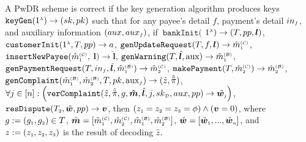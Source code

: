 \begin{definition}[Correctness] A PwDR scheme is correct if the key generation algorithm produces keys $\mathtt{keyGen}(1^{\scriptscriptstyle \lambda})\rightarrow (sk,pk)$ such that for any payee's detail $f$, payment's detail $in_{\scriptscriptstyle f}$, and auxiliary information $(aux, aux_{\scriptscriptstyle f})$, if $\ \mathtt{bankInit}($ $1^{\scriptscriptstyle \lambda})\rightarrow (T, pp, \bm{l})$, $\mathtt{customerInit} (1^{\scriptscriptstyle \lambda}, T, pp)\rightarrow a$, $\mathtt{genUpdateRequest}(T, f, {\bm l})\rightarrow \hat m^{\scriptscriptstyle\mathcal{(C)}}_{\scriptscriptstyle 1}$, $\mathtt{insertNewPayee}(\hat{m}^{\scriptscriptstyle\mathcal{(C)}}_{\scriptscriptstyle 1}, $ ${\bm l})\rightarrow  \hat{\bm l}$, $\mathtt{genWarning}(T, \hat{\bm l}, \text{aux})\rightarrow \hat m^{\scriptscriptstyle\mathcal{(B)}}_{\scriptscriptstyle1}$, $\mathtt{genPaymentRequest}(T, in_{\scriptscriptstyle f}, \hat{\bm{l}}, \hat m^{\scriptscriptstyle\mathcal{(B)}}_{\scriptscriptstyle1})\rightarrow \hat m^{\scriptscriptstyle\mathcal{(C)}}_{\scriptscriptstyle2}$, $\mathtt{makePayment}(T, \hat m^{\scriptscriptstyle\mathcal{(C)}}_{\scriptscriptstyle2})\rightarrow \hat m^{\scriptscriptstyle\mathcal{(B)}}_{\scriptscriptstyle2}$, $\mathtt{genComplaint}(\hat m^{\scriptscriptstyle\mathcal{(B)}}_{\scriptscriptstyle 1}, \hat m^{\scriptscriptstyle\mathcal{(B)}}_{\scriptscriptstyle2}, T, pk, \text{aux}_{\scriptscriptstyle f})\rightarrow (\hat z, \hat{\ddot \pi})$, 
$\forall j\in [n]:\\ \Big(\mathtt{verComplaint}( \hat z, \hat{\ddot{\pi}}, g, \bm{\hat{m}}, \hat{\bm{l}}, j, sk_{\scriptscriptstyle\mathcal D}, aux, pp)\rightarrow \hat{\bm{w}_{\scriptscriptstyle j}}\Big)$, 
 $\mathtt{resDispute}(T_{\scriptscriptstyle 2}, \hat {\bm w}, pp)\rightarrow {\bm v}$, then $(z_{\scriptscriptstyle 1}=z_{\scriptscriptstyle 2}=z_{\scriptscriptstyle 3}=\phi) \wedge({\bm{v}}=0)$, where $g:=(g_{\scriptscriptstyle 1}, g_{\scriptscriptstyle 2})\in T$,   $\hat {\bm m}=[\hat {m}^{\scriptscriptstyle (\mathcal{C})}_{\scriptscriptstyle 1}, \hat {m}^{\scriptscriptstyle (\mathcal{C})}_{\scriptscriptstyle 2}, \hat {m}^{\scriptscriptstyle (\mathcal{B})}_{\scriptscriptstyle 1}, \hat {m}^{\scriptscriptstyle (\mathcal{B})}_{\scriptscriptstyle 2}]$,   $\hat {\bm w}=[{\hat{\bm w}}_{\scriptscriptstyle 1},...,{\hat{\bm w}}_{\scriptscriptstyle n}]$,  and $z:=(z_{\scriptscriptstyle 1}, z_{\scriptscriptstyle 2}, z_{\scriptscriptstyle 3})$ is the result of  decoding  $\hat{z}$.
\end{definition}






